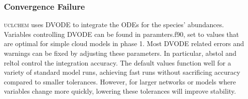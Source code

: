 \documentclass{llncs}
\begin{document}
\subsubsection{Convergence Failure}
\textsc{uclchem} uses DVODE to integrate the ODEs for the species' abundances. Variables controlling DVODE can be found in paramters.f90, set to values that are optimal for simple cloud models in phase 1. Most DVODE related errors and warnings can be fixed by adjusting these parameters. In particular, abstol and reltol control the integration accuracy. The default values function well for a variety of standard model runs, achieving fast runs without sacrificing accuracy compared to smaller tolerances. However, for larger networks or models where variables change more quickly, lowering these tolerances will improve stability.



\end{document}
